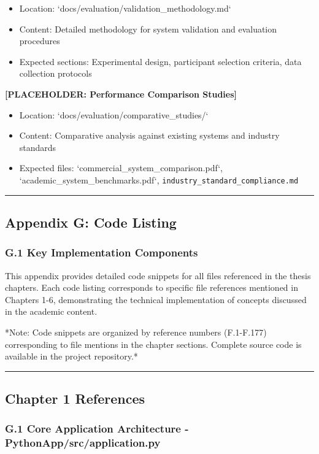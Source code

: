 \documentclass[12pt,a4paper]{article}
\begin{document}
\begin{itemize}
\item Location: `docs/evaluation/validation_methodology.md`
\item Content: Detailed methodology for system validation and evaluation procedures
\item Expected sections: Experimental design, participant selection criteria, data collection protocols

\end{itemize}
\textbf{[PLACEHOLDER: Performance Comparison Studies]}

\begin{itemize}
\item Location: `docs/evaluation/comparative_studies/`
\item Content: Comparative analysis against existing systems and industry standards
\item Expected files: `commercial_system_comparison.pdf`, `academic_system_benchmarks.pdf`,
  \texttt{industry\_standard\_compliance.md}

\end{itemize}
\hrule

\subsection{Appendix G: Code Listing}

\subsubsection{G.1 Key Implementation Components}

This appendix provides detailed code snippets for all files referenced in the thesis chapters. Each code listing
corresponds to specific file references mentioned in Chapters 1-6, demonstrating the technical implementation of
concepts discussed in the academic content.

*Note: Code snippets are organized by reference numbers (F.1-F.177) corresponding to file mentions in the chapter
sections. Complete source code is available in the project repository.*

\hrule

\subsection{Chapter 1 References}

\subsubsection{G.1 Core Application Architecture - PythonApp/src/application.py}
\end{document}
